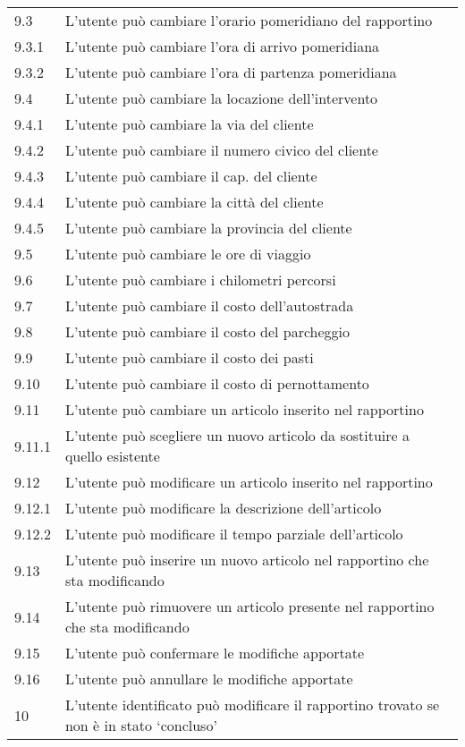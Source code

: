 \begin{longtable}{||p{} p{10.55cm}||}
		9.3 & L’utente può cambiare l’orario pomeridiano del rapportino\\
		9.3.1 & L’utente può cambiare l’ora di arrivo pomeridiana\\
		9.3.2 & L’utente può cambiare l’ora di partenza pomeridiana\\
		9.4 & L’utente può cambiare la locazione dell’intervento\\
		9.4.1 & L’utente può cambiare la via del cliente\\
		9.4.2 & L’utente può cambiare il numero civico del cliente \\
		9.4.3 & L’utente può cambiare il cap. del cliente\\
		9.4.4 & L’utente può cambiare la città del cliente\\
		9.4.5 & L’utente può cambiare la provincia del cliente\\
		9.5 & L’utente può cambiare le ore di viaggio\\
		9.6 & L’utente può cambiare i chilometri percorsi\\
		9.7 & L’utente può cambiare il costo dell’autostrada\\
		9.8 & L’utente può cambiare il costo del parcheggio\\
		9.9 & L’utente può cambiare il costo dei pasti\\
		9.10 & L’utente può cambiare il costo di pernottamento\\
		9.11 & L’utente può cambiare un articolo inserito nel rapportino\\
		9.11.1 & L’utente può scegliere un nuovo articolo da sostituire a quello esistente\\ 
		9.12 & L’utente può modificare un articolo inserito nel rapportino\\
		9.12.1 & L’utente può modificare la descrizione dell’articolo\\
		9.12.2 & L’utente può modificare il tempo parziale dell’articolo\\
		9.13 & L’utente può inserire un nuovo articolo nel rapportino che sta modificando\\
		9.14 & L’utente può rimuovere un articolo presente nel rapportino che sta modificando\\
		9.15 & L’utente può confermare le modifiche apportate\\
		9.16 & L’utente può annullare le modifiche apportate\\	
		\hline
		10 & L’utente identificato può modificare il rapportino trovato se non è in stato ‘concluso’\\

\end{longtable}
